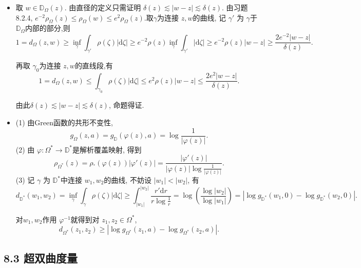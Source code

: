 \begin{itemize}
    由单连通区域上双曲度量的定义
    \begin{align*}
        |\log \rho_\Omega(z) - \log \rho_\Omega(w)| 
        &= \Big|\log \frac{2}{|\varphi'(0)|} 
        - \log \frac{2}{|\varphi'(\zeta)|(1-|\zeta|^2)} \Big| 
        =  \Big|\log \frac{|\varphi'(\zeta)|(1-|\zeta|^2)}{|\varphi'(0)|}\Big|\\
        &\le \log \Bigl(\frac{1+|\zeta|}{1-|\zeta|}\Bigr)^2 
        = 2 d_{\mathbb{D}}(\varphi^{-1}(z),\varphi^{-1}(w)) = 2d_{\Omega}(z,w).
    \end{align*}

    \item[8.2.5] 取  $w \in \mathbb{D}_\Omega(z)$. 
    由直径的定义只需证明  $\delta(z)\lesssim |w-z|\lesssim \delta(z)$. 
    由习题 8.2.4,  $e^{-2} \rho_\Omega(z)\le \rho_{\Omega}(w)
    \le e^{2}\rho_{\Omega}(z)$.取$\gamma$为连接 $z,w$的曲线, 
    记 $\gamma'$ 为 $\gamma$于 $\mathbb{D}_{\Omega}$内部的部分,则
    $$1=d_{\Omega}(z,w)\ge  \inf_{\gamma} \int_{\gamma'}\rho(\zeta) |\mathrm{d}\zeta|
    \ge e^{-2}\rho(z)\inf_{\gamma} \int_{\gamma'} |\mathrm{d}\zeta|
    \ge e^{-2}\rho(z) |w-z|\ge \frac{2e^{-2}|w-z|}{\delta(z)}.$$

   再取 $\gamma_0$为连接 $z,w$的直线段,有
   $$1 = d_{\Omega}(z,w)\le \int_{\gamma_0}\rho(\zeta) |\mathrm{d}\zeta|
   \le e^2 \rho(z) |w-z|\le \frac{2e^2 |w-z|}{\delta(z)}.  $$

   由此$\delta(z)\lesssim |w-z|\lesssim \delta(z)$, 命题得证.
    \item[8.2.6]   (1) 由Green函数的共形不变性,
    $$g_{\Omega}(z,a) = g_{\mathbb{D}}(\varphi(z),a) 
    = \log \frac{1}{|\varphi(z)|}.$$
    (2) 由 $\varphi:\Omega^*\to \mathbb{D}^*$是解析覆盖映射, 得到 
    $$\rho_{\Omega^*}(z) = \rho_{^*}(\varphi(z))|\varphi'(z)| 
    = \frac{|\varphi'(z)|}{|\varphi(z)|\log \frac{1}{|\varphi(z)|}}.$$
    (3) 记 $\gamma$ 为 $\mathbb{D}^*$中连接 $w_1,w_2$的曲线,
    不妨设 $|w_1|<|w_2|$, 有
    $$d_{\mathbb{D}^*}(w_1,w_2) 
    = \inf_{\gamma}\int_{\gamma}\rho(\zeta) |\mathrm{d}\zeta|
    \ge \int_{|w_1|}^{|w_2|} \frac{r' \mathrm{d}r}{r\log \frac{1}{r}} 
    = \log\left(\frac{\log|w_2|}{\log|w_1|}\right) 
    = |\log g_{\mathbb{D}^*}(w_1,0)-\log g_{\mathbb{D}^*}(w_2,0)|.$$

    对$w_1,w_2$作用 $\varphi^{-1}$就得到对 $z_1,z_2 \in \Omega^*$, 
    $$d_{\Omega^*}(z_1,z_2)\ge|\log g_{\Omega^*}(z_1,a)-\log g_{\Omega^*}(z_2,a)|. $$
\end{itemize}

\subsection*{8.3 超双曲度量}

